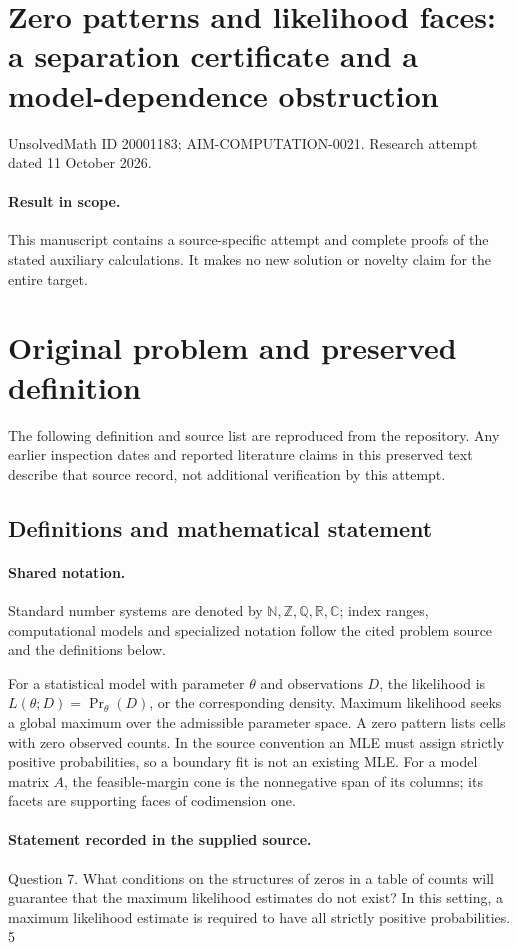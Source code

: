 \documentclass[11pt]{article}
\begin{document}
\section*{Zero patterns and likelihood faces: a separation certificate and a model-dependence obstruction}
\noindent UnsolvedMath ID 20001183; AIM-COMPUTATION-0021. Research attempt dated 11 October 2026.
\paragraph{Result in scope.}This manuscript contains a source-specific attempt and complete proofs of the stated auxiliary calculations. It makes no new solution or novelty claim for the entire target.
\section{Original problem and preserved definition}
The following definition and source list are reproduced from the repository. Any earlier inspection dates and reported literature claims in this preserved text describe that source record, not additional verification by this attempt.
\subsection{Definitions and mathematical statement}

\paragraph{Shared notation.}Standard number systems are denoted by $\mathbb N,\mathbb Z,\mathbb Q,\mathbb R,\mathbb C$; index ranges, computational models and specialized notation follow the cited problem source and the definitions below.


For a statistical model with parameter $\theta$ and observations $D$, the likelihood is $L(\theta;D)=\Pr_\theta(D)$, or the corresponding density. Maximum likelihood seeks a global maximum over the admissible parameter space. A zero pattern lists cells with zero observed counts. In the source convention an MLE must assign strictly positive probabilities, so a boundary fit is not an existing MLE. For a model matrix $A$, the feasible-margin cone is the nonnegative span of its columns; its facets are supporting faces of codimension one.
\paragraph{Statement recorded in the supplied source.}
Question 7. What conditions on the structures of zeros in a table of counts will guarantee that the maximum likelihood estimates do not exist? In this setting, a maximum likelihood estimate is required to have all strictly positive probabilities. 5
\end{document}
